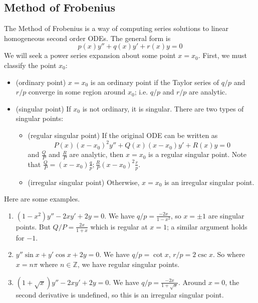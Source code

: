\subsection{Method of Frobenius}
The Method of Frobenius is a way of computing series solutions to linear homogeneous second order ODEs. The general form is
\[ p(x)y'' + q(x)y' + r(x)y = 0 \]
We will seek a power series expansion about some point \(x = x_0\). First, we must classify the point \(x_0\):
\begin{itemize}
	\item (ordinary point) \(x=x_0\) is an ordinary point if the Taylor series of \(q/p\) and \(r/p\) converge in some region around \(x_0\); i.e. \(q/p\) and \(r/p\) are analytic.
	\item (singular point) If \(x_0\) is not ordinary, it is singular. There are two types of singular points:
	      \begin{itemize}
		      \item (regular singular point) If the original ODE can be written as
		            \[ P(x)(x-x_0)^2 y'' + Q(x)(x-x_0)y' + R(x)y = 0 \]
		            and \(\frac{Q}{P}\) and \(\frac{R}{P}\) are analytic, then \(x=x_0\) is a regular singular point. Note that \(\frac{Q}{P} = (x-x_0)\frac{q}{p}; \frac{R}{P}(x-x_0)^2\frac{r}{p}\).
		      \item (irregular singular point) Otherwise, \(x=x_0\) is an irregular singular point.
	      \end{itemize}
\end{itemize}
Here are some examples.
\begin{enumerate}
	\item \((1-x^2)y'' - 2xy' + 2y = 0\). We have \(q/p = \frac{-2x}{1-x^2}\), so \(x = \pm 1\) are singular points. But \(Q/P = \frac{2x}{1+x}\) which is regular at \(x=1\); a similar argument holds for \(-1\).
	\item \(y''\sin x + y'\cos x + 2y = 0\). We have \(q/p = \cot x\), \(r/p = 2\csc x\). So where \(x = n\pi\) where \(n \in \mathbb Z\), we have regular singular points.
	\item \((1+\sqrt{x})y'' - 2xy' + 2y = 0\). We have \(q/p = \frac{-2x}{1+\sqrt{x}}\). Around \(x=0\), the second derivative is undefined, so this is an irregular singular point.
\end{enumerate}
